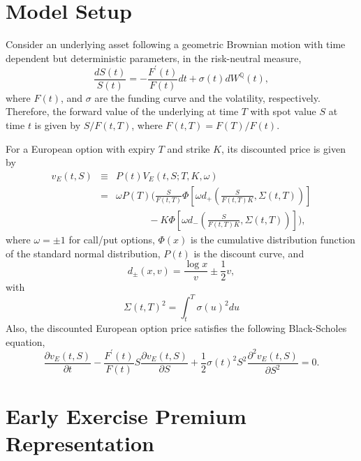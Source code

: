 \documentclass[12pt]{article}
\begin{document}
  \section{Model Setup}

    Consider an underlying asset following a geometric Brownian motion with time dependent but deterministic
    parameters, in the risk-neutral measure,
    \begin{equation}
      \frac{dS(t)}{S(t)}=-\frac{F^{\prime}(t)}{F(t)}dt+\sigma(t)dW^{\mathbb Q}(t),
    \end{equation}
    where $F(t)$, and $\sigma$ are the funding curve and the volatility, respectively. Therefore, the
    forward value of the underlying at time $T$ with spot value $S$ at time $t$ is given by $S/F(t,T)$,
    where $F(t,T)=F(T)/F(t)$.

    For a European option with expiry $T$ and strike $K$, its discounted price is given by
    \begin{eqnarray}
      \label{Euro1}
      v_E(t,S)&\equiv&P(t)V_E(t,S;T,K,\omega)\nonumber\\
                         &=&\omega P(T)\bigg(\frac{S}{F(t,T)}\Phi\left[\omega d_+\left(\frac{S}{F(t,T)K},\Sigma(t,T)\right)\right]\nonumber\\
                         &&\ \ \ \ \ \ \ \ \ \ \ \ \ \ \ -K\Phi\left[\omega d_-\left(\frac{S}{F(t,T)K},\Sigma(t,T)\right)\right]\bigg),
    \end{eqnarray}
    where $\omega=\pm 1$ for call/put options, $\Phi(x)$ is the cumulative distribution function of the standard normal distribution,
    $P(t)$ is the discount curve, and
    \begin{equation}
      d_{\pm}(x, v)=\frac{\log x}{v}\pm\frac{1}{2}v,
    \end{equation}
    with
    \begin{equation}
      \Sigma(t,T)^2=\int_t^T\sigma(u)^2du
    \end{equation}
    Also, the discounted European option price satisfies the following Black-Scholes equation,
    \begin{equation}
      \frac{\partial v_E(t,S)}{\partial t}-\frac{F^{\prime}(t)}{F(t)}S\frac{\partial v_E(t,S)}{\partial S}
         +\frac{1}{2}\sigma(t)^2S^2\frac{\partial^2 v_E(t,S)}{\partial S^2}=0.
    \end{equation}



  \section{Early Exercise Premium Representation}
\end{document}
